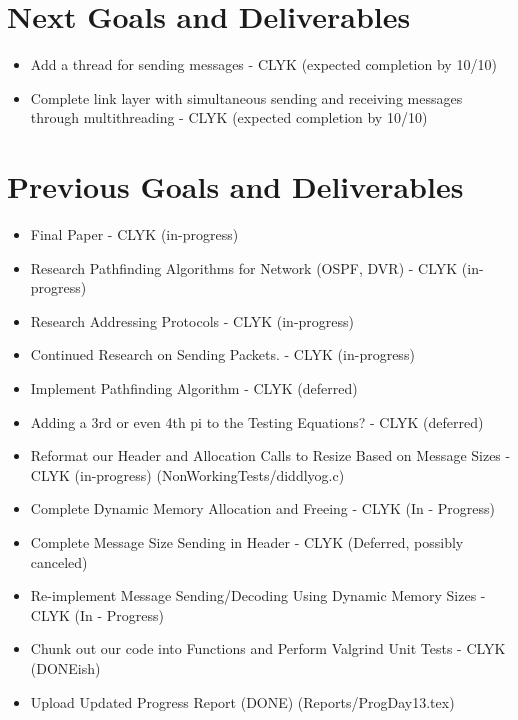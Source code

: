 \documentclass{article}
\begin{document}
\section*{Next Goals and Deliverables}
\begin{itemize}
\item Add a thread for sending messages - CLYK (expected completion by 10/10)
\item Complete link layer with simultaneous sending and receiving messages through multithreading - CLYK (expected completion by 10/10)


\end{itemize}
\section*{Previous Goals and Deliverables}
\begin{itemize}
\item Final Paper - CLYK (in-progress)
\item Research Pathfinding Algorithms for Network (OSPF, DVR) - CLYK (in-progress)
\item Research Addressing Protocols - CLYK (in-progress)
\item Continued Research on Sending Packets. - CLYK (in-progress)
\item Implement Pathfinding Algorithm - CLYK (deferred)
\item Adding a 3rd or even 4th pi to the Testing Equations? - CLYK (deferred)
\item Reformat our Header and Allocation Calls to Resize Based on Message Sizes - CLYK (in-progress) (NonWorkingTests/diddlyog.c)
\item Complete Dynamic Memory Allocation and Freeing - CLYK (In - Progress)
\item Complete Message Size Sending in Header - CLYK (Deferred, possibly canceled)
\item Re-implement Message Sending/Decoding Using Dynamic Memory Sizes - CLYK (In - Progress)
\item Chunk out our code into Functions and Perform Valgrind Unit Tests - CLYK (DONEish)

\item Upload Updated Progress Report (DONE) (Reports/ProgDay13.tex)
\end{itemize}
\end{document}
